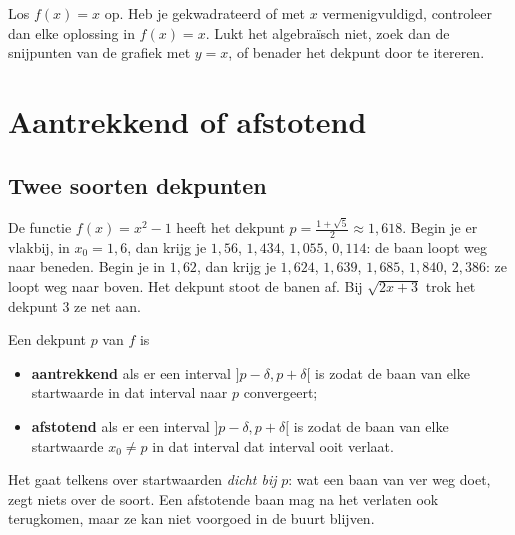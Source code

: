 \begin{werkwijze}
Los $f(x) = x$ op. Heb je gekwadrateerd of met $x$ vermenigvuldigd, controleer dan elke oplossing in $f(x) = x$. Lukt het algebraïsch niet, zoek dan de snijpunten van de grafiek met $y = x$, of benader het dekpunt door te itereren.
\end{werkwijze}


\begin{oefeningen}
\end{oefeningen}

\section{Aantrekkend of afstotend}

\subsection{Twee soorten dekpunten}

De functie $f(x) = x^2 - 1$ heeft het dekpunt $p = \tfrac{1 + \sqrt5}{2} \approx 1{,}618$. Begin je er vlakbij, in $x_0 = 1{,}6$, dan krijg je $1{,}56$, $1{,}434$, $1{,}055$, $0{,}114$: de baan loopt weg naar beneden. Begin je in $1{,}62$, dan krijg je $1{,}624$, $1{,}639$, $1{,}685$, $1{,}840$, $2{,}386$: ze loopt weg naar boven. Het dekpunt stoot de banen af. Bij $\sqrt{2x + 3}$ trok het dekpunt 3 ze net aan.

\begin{theorie}
Een dekpunt $p$ van $f$ is
\begin{itemize}
\item \textbf{\textcolor{accent}{aantrekkend}} als er een interval $]p - \delta, p + \delta[$ is zodat de baan van elke startwaarde in dat interval naar $p$ convergeert;
\item \textbf{\textcolor{accent}{afstotend}} als er een interval $]p - \delta, p + \delta[$ is zodat de baan van elke startwaarde $x_0 \neq p$ in dat interval dat interval ooit verlaat.
\end{itemize}
\end{theorie}

Het gaat telkens over startwaarden \textit{dicht bij} $p$: wat een baan van ver weg doet, zegt niets over de soort. Een afstotende baan mag na het verlaten ook terugkomen, maar ze kan niet voorgoed in de buurt blijven.

